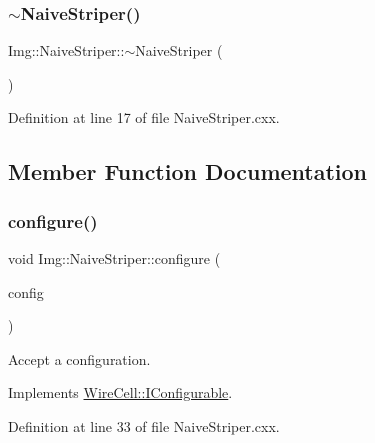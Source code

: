 \subsubsection{\texorpdfstring{$\sim$\+Naive\+Striper()}{~NaiveStriper()}}
{\footnotesize\ttfamily Img\+::\+Naive\+Striper\+::$\sim$\+Naive\+Striper (\begin{DoxyParamCaption}{ }\end{DoxyParamCaption})\hspace{0.3cm}{\ttfamily [virtual]}}



Definition at line 17 of file Naive\+Striper.\+cxx.



\subsection{Member Function Documentation}
\mbox{\label{class_wire_cell_1_1_img_1_1_naive_striper_ad71a8917383f9efbb9d963a5a6535160}} 
\subsubsection{\texorpdfstring{configure()}{configure()}}
{\footnotesize\ttfamily void Img\+::\+Naive\+Striper\+::configure (\begin{DoxyParamCaption}\item[{const \hyperlink{namespace_wire_cell_a9f705541fc1d46c608b3d32c182333ee}{Wire\+Cell\+::\+Configuration} \&}]{config }\end{DoxyParamCaption})\hspace{0.3cm}{\ttfamily [virtual]}}



Accept a configuration. 



Implements \hyperlink{class_wire_cell_1_1_i_configurable_a57ff687923a724093df3de59c6ff237d}{Wire\+Cell\+::\+I\+Configurable}.



Definition at line 33 of file Naive\+Striper.\+cxx.

\mbox{\label{class_wire_cell_1_1_img_1_1_naive_striper_abec6eadf74638aa14d86442bc23e2a7a}} 
